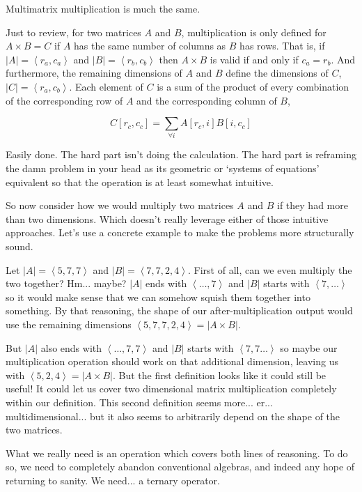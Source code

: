 \documentclass[12pt]{book}
\theoremstyle{plain}
\theoremstyle{definition}
\theoremstyle{ppart}
\theoremstyle{case}
\theoremstyle{solution}
\newcommand{\shape}[1]{\left|#1\right|}
\begin{document}
Multimatrix multiplication is much the same.

Just to review, for two matrices $A$ and $B$, multiplication is only defined
for $A \times B = C$ if $A$ has the same number of columns as $B$ has rows.
That is, if $\shape{A} = \left< r_a, c_a \right>$ and $\shape{B} = \left< r_b, c_b \right>$
then $A \times B$ is valid if and only if $c_a = r_b$. And furthermore,
the remaining dimensions of $A$ and $B$ define the dimensions of $C$,
$\shape{C} = \left< r_a, c_b \right>$. Each element of $C$ is a sum of the product of
every combination of the corresponding row of $A$ and the corresponding column of
$B$,

\[ C[r_c, c_c] = \sum_{\forall i} A[r_c, i] B[i, c_c] \]

Easily done. The hard part isn't doing the calculation. The hard part is reframing the
damn problem in your head as its geometric or `systems of equations' equivalent so that
the operation is at least somewhat intuitive.

So now consider how we would multiply two matrices $A$ and $B$ if they had more
than two dimensions. Which doesn't really leverage either of those intuitive
approaches. Let's use a concrete example to make the problems more structurally sound.

Let $\shape{A} = \left<5,7,7\right>$ and $\shape{B} = \left<7,7,2,4\right>$.
First of all, can we even multiply the two together? Hm... maybe? $\shape{A}$ ends with
$\left<\ldots, 7\right>$ and $\shape{B}$ starts with $\left<7,\ldots\right>$ so it would
make sense that we can somehow squish them together into something. By that reasoning,
the shape of our after-multiplication output would use the remaining dimensions
$\left<5, 7, 7, 2, 4\right> = \shape{A \times B}$.

But $\shape{A}$ also ends with $\left<\ldots, 7, 7\right>$ and $\shape{B}$ starts with
$\left<7, 7\ldots\right>$ so maybe our multiplication operation should work on that
additional dimension, leaving us with $\left<5, 2, 4\right> = \shape{A \times B}$.
But the first definition looks like it could still be useful! It could let us cover 
two dimensional matrix multiplication completely within our definition. This second
definition seems more... er... multidimensional... but it also seems to
arbitrarily depend on the shape of the two matrices.

What we really need is an operation which covers both lines of reasoning. To do
so, we need to completely abandon conventional algebras, and indeed any hope of
returning to sanity. We need... a ternary operator.
\end{document}
